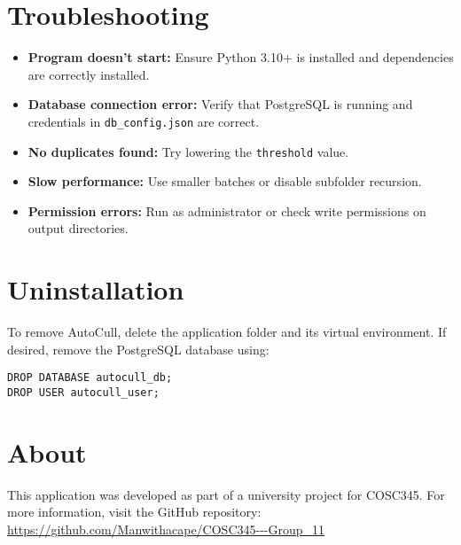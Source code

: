 \documentclass[12pt,a4paper]{article}
\begin{document}
\section{Troubleshooting}

\begin{itemize}
    \item \textbf{Program doesn’t start:}  
      Ensure Python 3.10+ is installed and dependencies are correctly installed.

    \item \textbf{Database connection error:}  
      Verify that PostgreSQL is running and credentials in \texttt{db\_config.json} are correct.

    \item \textbf{No duplicates found:}  
      Try lowering the \texttt{threshold} value.

    \item \textbf{Slow performance:}  
      Use smaller batches or disable subfolder recursion.

    \item \textbf{Permission errors:}  
      Run as administrator or check write permissions on output directories.
\end{itemize}


\section{Uninstallation}

To remove AutoCull, delete the application folder and its virtual environment.  
If desired, remove the PostgreSQL database using:

\begin{lstlisting}[style=console]
DROP DATABASE autocull_db;
DROP USER autocull_user;
\end{lstlisting}


\section{About}

This application was developed as part of a university project for COSC345. For more information, visit the GitHub repository: \url{https://github.com/Manwithacape/COSC345---Group_11}
\end{document}
